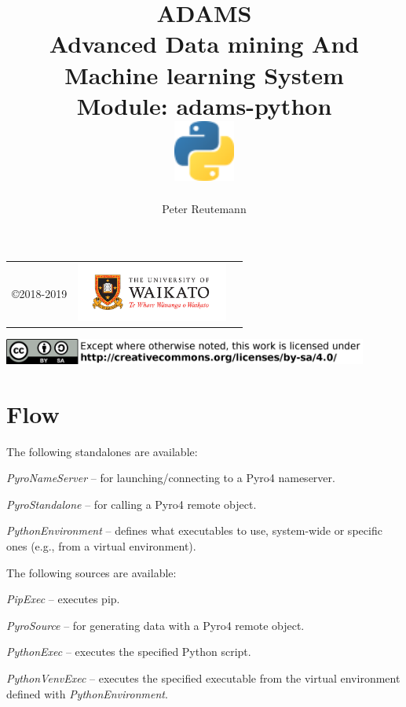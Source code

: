 \documentclass[a4paper]{book}
\title{
  \textbf{ADAMS} \\
  {\Large \textbf{A}dvanced \textbf{D}ata mining \textbf{A}nd \textbf{M}achine
  learning \textbf{S}ystem} \\
  {\Large Module: adams-python} \\
  \vspace{1cm}
  \includegraphics[width=2cm]{images/python-module.png} \\
}
\author{
  Peter Reutemann
}
\begin{document}
\begin{titlepage}
\maketitle

\thispagestyle{empty}
\center
\begin{table}[b]
	\begin{tabular}{c l l}
		\parbox[c][2cm]{2cm}{\copyright 2018-2019} &
		\parbox[c][2cm]{5cm}{\includegraphics[width=5cm]{images/coat_of_arms.pdf}}
	\end{tabular}
	\includegraphics[width=12cm]{images/cc.png} \\
\end{table}

\end{titlepage}

\tableofcontents

\chapter{Flow}

The following standalones are available:
\begin{tight_itemize}
  \item \textit{PyroNameServer} -- for launching/connecting to a Pyro4\cite{pyro4} nameserver.
  \item \textit{PyroStandalone} -- for calling a Pyro4\cite{pyro4} remote object.
  \item \textit{PythonEnvironment} -- defines what executables to use, system-wide
  or specific ones (e.g., from a virtual environment).
\end{tight_itemize}

The following sources are available:
\begin{tight_itemize}
  \item \textit{PipExec} -- executes pip.
  \item \textit{PyroSource} -- for generating data with a Pyro4\cite{pyro4} remote object.
  \item \textit{PythonExec} -- executes the specified Python script.
  \item \textit{PythonVenvExec} -- executes the specified executable from the virtual
  environment defined with \textit{PythonEnvironment}.
\end{tight_itemize}
\end{document}
